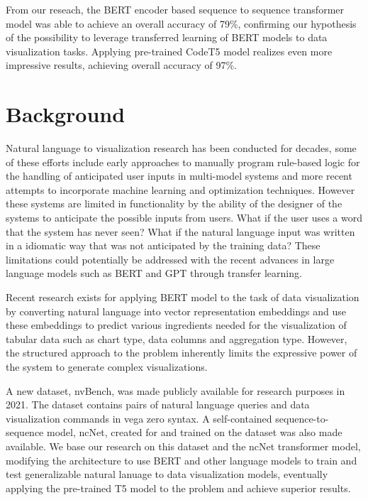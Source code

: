 \documentclass[
	a4paper, %
	10pt, %
	unnumberedsections, %
	twoside, %
]{t0003}
\begin{document}
From our reseach, the BERT encoder based sequence to sequence transformer model was able to achieve an overall accuracy of 79\%, confirming our hypothesis of the possibility to leverage transferred learning of BERT models to data visualization tasks. Applying pre-trained CodeT5 model realizes even more impressive results, achieving overall accuracy of 97\%.

\section{Background}

Natural language to visualization research has been conducted for decades, some of these efforts include early approaches to manually program rule-based logic for the handling of anticipated user inputs in multi-model systems\cite{Cox:2001qr} and more recent attempts to incorporate machine learning and optimization techniques\cite{Aurisano:2016qr}. However these systems are limited in functionality by the ability of the designer of the systems to anticipate the possible inputs from users. What if the user uses a word that the system has never seen? What if the natural language input was written in a idiomatic way that was not anticipated by the training data? These limitations could potentially be addressed with the recent advances in large language models such as BERT and GPT through transfer learning.

Recent research exists for applying BERT model to the task of data visualization\cite{Can:2021qr} by converting natural language into vector representation embeddings and use these embeddings to predict various ingredients needed for the visualization of tabular data such as chart type, data columns and aggregation type. However, the structured approach to the problem inherently limits the expressive power of the system to generate complex visualizations.

A new dataset, nvBench\cite{Luo:2021qr}, was made publicly available for research purposes in 2021. The dataset contains pairs of natural language queries and data visualization commands in vega zero syntax\cite{Luo:2022qr}. A self-contained sequence-to-sequence model, ncNet\cite{Luo:2022qr}, created for and trained on the dataset was also made available. We base our research on this dataset and the ncNet transformer model, modifying the architecture to use BERT and other language models to train and test generalizable natural lanuage to data visualization models, eventually applying the pre-trained T5 model to the problem and achieve superior results. 
\end{document}
